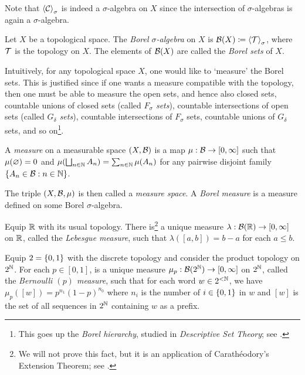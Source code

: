 \documentclass[reqno, twoside]{article}
\begin{document}
    Note that $\left\langle\mathcal{C}\right\rangle_\sigma$ is indeed a $\sigma$-algebra on $X$ since the intersection of $\sigma$-algebras is again a $\sigma$-algebra.

    \begin{definition}
        Let $X$ be a topological space. The \textit{Borel $\sigma$-algebra} on $X$ is $\mathcal{B}(X)\coloneqq\left\langle\mathcal{T}\right\rangle_\sigma$, where $\mathcal{T}$ is the topology on $X$. The elements of $\mathcal{B}(X)$ are called the \textit{Borel sets} of $X$.
    \end{definition}

    Intuitively, for any topological space $X$, one would like to `measure' the Borel sets. This is justified since if one wants a measure compatible with the topology, then one must be able to measure the open sets, and hence also closed sets, countable unions of closed sets (called \textit{$F_\sigma$ sets}), countable intersections of open sets (called \textit{$G_\delta$ sets}), countable intersections of $F_\sigma$ sets, countable unions of $G_\delta$ sets, and so on\footnote{This goes up the \textit{Borel hierarchy}, studied in \textit{Descriptive Set Theory}; see \cite{Kec95}.}.

    \begin{definition}
        A \textit{measure} on a measurable space $(X,\mathcal{B})$ is a map $\mu:\mathcal{B}\to[0,\infty]$ such that $\mu(\varnothing)=0$ and $\mu(\bigsqcup_{n\in\mathbb{N}}A_n)=\sum_{n\in\mathbb{N}}\mu(A_n)$ for any pairwise disjoint family $\left\{A_n\in\mathcal{B}: n\in\mathbb{N}\right\}$.

        The triple $(X,\mathcal{B},\mu)$ is then called a \textit{measure space}. A \textit{Borel measure} is a measure defined on some Borel $\sigma$-algebra.
    \end{definition}

    \begin{example}[Lebesgue]\label{exa:lebesgue}
        Equip $\mathbb{R}$ with its usual topology. There is\footnote{We will not prove this fact, but it is an application of Carathéodory's Extension Theorem; see \cite[Lecture 4]{Tse23}.} a unique measure $\lambda:\mathcal{B}(\mathbb{R})\to[0,\infty]$ on $\mathbb{R}$, called the \textit{Lebesgue measure}, such that $\lambda([a,b])=b-a$ for each $a\leq b$.
    \end{example}

    \begin{example}[Bernoulli]\label{exa:bernoulli}
        Equip $2=\left\{0,1\right\}$ with the discrete topology and consider the product topology on $2^{\mathbb{N}}$. For each $p\in[0,1]$, is a unique measure $\mu_p:\mathcal{B}(2^{\mathbb{N}})\to[0,\infty]$ on $2^{\mathbb{N}}$, called the \textit{Bernoulli $(p)$ measure}, such that for each word $w\in2^{<\mathbb{N}}$, we have $\mu_p([w])=p^{n_1}(1-p)^{n_0}$ where $n_i$ is the number of $i\in\left\{0,1\right\}$ in $w$ and $[w]$ is the set of all sequences in $2^{\mathbb{N}}$ containing $w$ as a prefix.
    \end{example}
\end{document}
